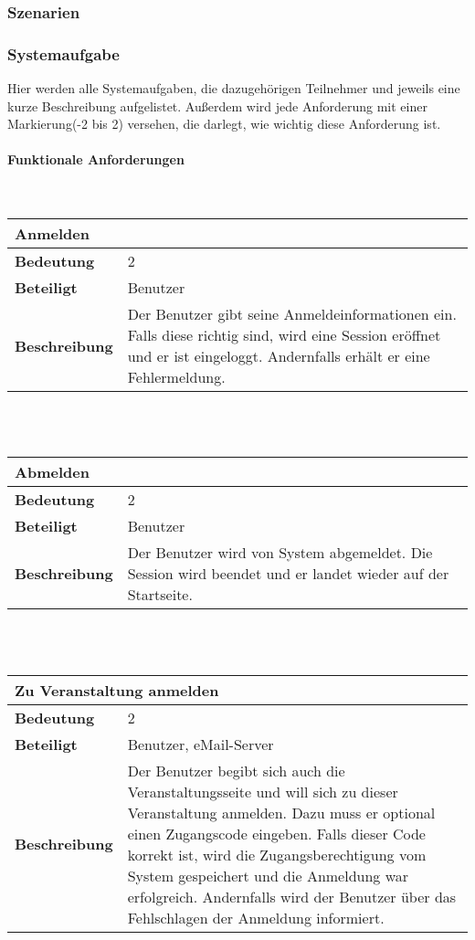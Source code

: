 \documentclass[12pt,a4paper]{article}
\begin{document}
\subsubsection{Szenarien}
\subsubsection{Systemaufgabe}
Hier werden alle Systemaufgaben, die dazugehörigen Teilnehmer und jeweils eine kurze Beschreibung aufgelistet. Außerdem wird jede Anforderung mit einer Markierung(-2 bis 2) versehen, die darlegt, wie wichtig diese Anforderung ist.
\paragraph{Funktionale Anforderungen}\mbox{}\\

\begin{tabular}{l p{10cm}}
\multicolumn{2}{l}{\textbf{Anmelden}} \\ \hline
\textbf{Bedeutung} & 2 \\ \hline 
\textbf{Beteiligt} & Benutzer \\ \hline 
\textbf{Beschreibung} & Der Benutzer gibt seine Anmeldeinformationen ein. Falls diese richtig sind, wird eine Session eröffnet und er ist eingeloggt. Andernfalls erhält er eine Fehlermeldung. \\ 
\hline 
\end{tabular}\\\\

\begin{tabular}{l p{10cm}}
\multicolumn{2}{l}{\textbf{Abmelden}} \\ \hline
\textbf{Bedeutung} & 2 \\ \hline 
\textbf{Beteiligt} & Benutzer \\ \hline 
\textbf{Beschreibung} & Der Benutzer wird von System abgemeldet. Die Session wird beendet und er landet wieder auf der Startseite. \\ 
\hline 
\end{tabular}\\\\

\begin{tabular}{l p{10cm}}
\multicolumn{2}{l}{\textbf{Zu Veranstaltung anmelden}} \\ \hline
\textbf{Bedeutung} & 2 \\ \hline 
\textbf{Beteiligt} & Benutzer, eMail-Server \\ \hline 
\textbf{Beschreibung} & Der Benutzer begibt sich auch die Veranstaltungsseite und will sich zu dieser Veranstaltung anmelden. Dazu muss er optional einen Zugangscode eingeben. Falls dieser Code korrekt ist, wird die Zugangsberechtigung vom System gespeichert und die Anmeldung war erfolgreich. Andernfalls wird der Benutzer über das Fehlschlagen der Anmeldung informiert. \\ 
\hline 
\end{tabular}\\\\
\end{document}
